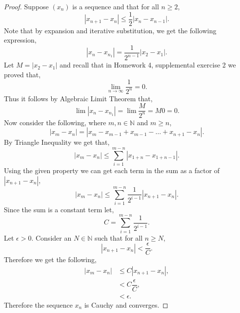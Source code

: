 \documentclass[12pt]{article}
\makeatletter
\theoremstyle{homework}
\newenvironment{exercise}[1]
{\def\@currentlabel{#1}\exercisecore}
{\endexercisecore}
\newcommand{\Nats}{\ensuremath{\mathbb N}}
\makeatother
\begin{document}
\begin{exercise}{7}
\begin{exercise}{8}
    \begin{proof}
      Suppose $(x_n)$ is a sequence and that for all $n \geq 2$,
      \begin{equation*}
        |x_{n+1} - x_n| \le \dfrac{1}{2} |x_n - x_{n-1}|.
      \end{equation*}
      Note that by expansion and iterative substitution, we get the following expression,
      \begin{equation*}
        |x_n - x_{n_1}| = \dfrac{1}{2^{n-1}}|x_2 - x_1|.
      \end{equation*}
      Let $M = |x_2 - x_1|$ and recall that in Homework 4, supplemental exercise 2 we proved that,
      \begin{equation*}
        \lim_{n \to \infty} \dfrac{1}{2^n} = 0. 
      \end{equation*}
      Thus it follows by Algebraic Limit Theorem that,
      \begin{equation*}
        \lim |x_n - x_{n_1}| = \lim \dfrac{M}{2^n} = M0 = 0.
      \end{equation*}
      Now consider the following, where $m,n \in \Nats$ and $m \geq n$,
      \begin{equation}
        |x_m - x_n| = |x_m - x_{m-1} + x_{m-1} - \dots + x_{n+1} - x_n|.
      \end{equation}
      By Triangle Inequality we get that,
      \begin{equation*}
        |x_m - x_n| \le \sum_{i = 1}^{m-n} |x_{1+n} - x_{1+n - 1}|.  
      \end{equation*}
      Using the given property we can get each term in the sum as a factor of $|x_{n+1} - x_n|$,
      \begin{equation*}
        |x_m - x_n| \le \sum_{i = 1}^{m-n} \dfrac{1}{2^{i-1}}|x_{n+1} - x_n|.
      \end{equation*}
      Since the sum is a constant term let,
      \begin{equation*}
        C = \sum_{i = 1}^{m-n} \dfrac{1}{2^{i-1}}.
      \end{equation*}
      Let $\epsilon > 0$. Consider an $N\in \Nats$ such that for all $n\geq N$,
      \begin{equation*}
        |x_{n+1} - x_n| < \dfrac{\epsilon}{C}. 
      \end{equation*}
      Therefore we get the following, 
      \begin{align*}
        |x_m - x_n| &\le C |x_{n+1} - x_n|,\\
        &< C \dfrac{\epsilon}{C},\\
        &< \epsilon.
      \end{align*} 
      Therefore the sequence $x_n$ is Cauchy and converges.
    \end{proof}
  \end{exercise}

\end{exercise}
\end{document}
